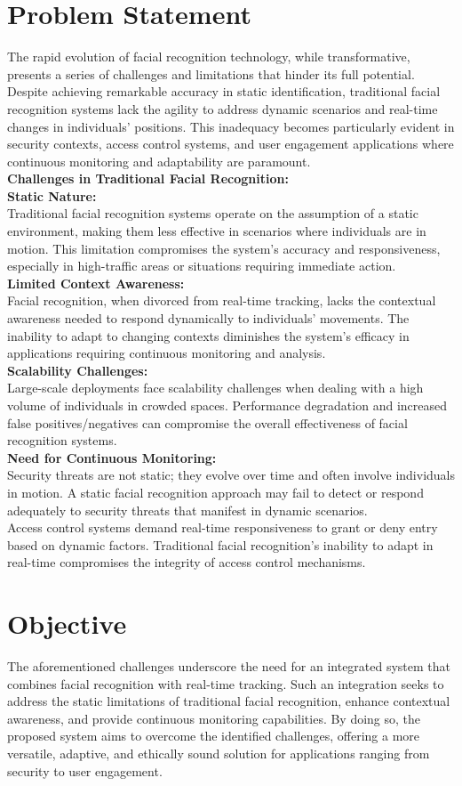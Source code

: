 \section{Problem Statement}
         The rapid evolution of facial recognition technology, while transformative, presents a series of challenges and limitations that hinder its full potential. Despite achieving remarkable accuracy in static identification, traditional facial recognition systems lack the agility to address dynamic scenarios and real-time changes in individuals' positions. This inadequacy becomes particularly evident in security contexts, access control systems, and user engagement applications where continuous monitoring and adaptability are paramount.\\
\textbf{Challenges in Traditional Facial Recognition:}\\
\textbf{Static Nature:}\\
Traditional facial recognition systems operate on the assumption of a static environment, making them less effective in scenarios where individuals are in motion.
This limitation compromises the system's accuracy and responsiveness, especially in high-traffic areas or situations requiring immediate action.\\
\textbf{Limited Context Awareness:}\\
Facial recognition, when divorced from real-time tracking, lacks the contextual awareness needed to respond dynamically to individuals' movements.
The inability to adapt to changing contexts diminishes the system's efficacy in applications requiring continuous monitoring and analysis.\\
\textbf{Scalability Challenges:}\\
Large-scale deployments face scalability challenges when dealing with a high volume of individuals in crowded spaces.
Performance degradation and increased false positives/negatives can compromise the overall effectiveness of facial recognition systems.\\
\textbf{Need for Continuous Monitoring:}\\
Security threats are not static; they evolve over time and often involve individuals in motion.
A static facial recognition approach may fail to detect or respond adequately to security threats that manifest in dynamic scenarios.\\
Access control systems demand real-time responsiveness to grant or deny entry based on dynamic factors.
Traditional facial recognition's inability to adapt in real-time compromises the integrity of access control mechanisms.
     
\section{Objective}
The aforementioned challenges underscore the need for an integrated system that combines facial recognition with real-time tracking. Such an integration seeks to address the static limitations of traditional facial recognition, enhance contextual awareness, and provide continuous monitoring capabilities. By doing so, the proposed system aims to overcome the identified challenges, offering a more versatile, adaptive, and ethically sound solution for applications ranging from security to user engagement.